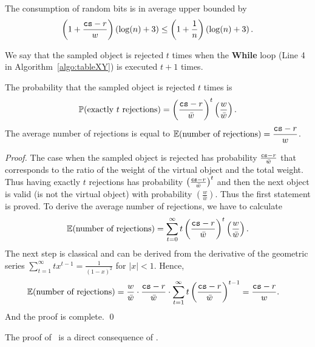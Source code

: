 \begin{proposition}
\label{prop:bits_consumption}
    The consumption of random bits is in average upper bounded by
    \[
        \left(1+\frac{\texttt{cs} - r}{w}\right) \left(\log(n) + 3\right) \leq \left(1+\frac{1}{n}\right) \left(\log(n) + 3\right).
    \]
\end{proposition}

We say that the sampled object is rejected $t$ times when the \textbf{While} loop 
(Line 4 in Algorithm~\ref{algo:tableXY}) is executed $t+1$ times.
\begin{lemma}
\label{lem:bits_consumption}
    The probability that the sampled object is rejected $t$ times is
    \[
        \mathbb{P}(\text{exactly }t \text{ rejections}) = \left( \frac{\texttt{cs} - r}{\bar{w}} \right)^t \left( \frac{w}{\bar{w}} \right).
    \]
    The average number of rejections is equal to $\displaystyle{\mathbb{E}(\text{number of rejections}) = \frac{\texttt{cs}- r}{w}}$.
\end{lemma}
\begin{proof}
    The case when the sampled object is rejected has probability $\frac{\texttt{cs} - r}{\bar{w}}$ that corresponds
    to the ratio of the weight of the virtual object and the total weight. 
    Thus having exactly $t$ rejections has probability $\left( \frac{\texttt{cs} - r}{\bar{w}} \right)^t$
    and then the next object is valid (is not the virtual object) with probability $\left( \frac{w}{\bar{w}} \right)$.
    Thus the first statement is proved.
    To derive the average number of rejections, we have to calculate 
    \[
        \mathbb{E}(\text{number of rejections}) = \sum_{t=0}^{\infty} t \left( \frac{\texttt{cs} - r}{\bar{w}} \right)^t \left( \frac{w}{\bar{w}} \right).  
    \]
    The next step is classical and can be derived from the derivative of the geometric series 
    $\sum_{t=1}^{\infty} t x^{t-1} = \frac{1}{(1-x)^2}$ for $|x|<1$.
    Hence,
    \begin{align*}
        \mathbb{E}(\text{number of rejections}) &= \frac{w}{\bar{w}} \cdot \frac{\texttt{cs} - r}{\bar{w}} \cdot \sum_{t=1}^{\infty} t \left( \frac{\texttt{cs} - r}{\bar{w}} \right)^{t-1} 
        = \frac{\texttt{cs} - r}{w}.
    \end{align*}
    And the proof is complete. \qed
\end{proof}


The proof of~ is a direct consequence of .